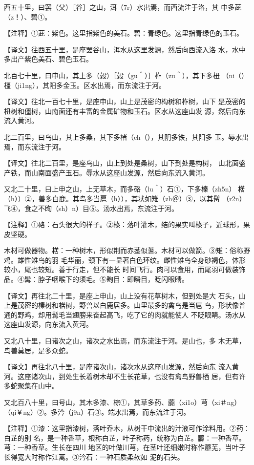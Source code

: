 \documentclass[a4paper,12pt,UTF8,twoside]{ctexbook}
\begin{document}
西五十里，曰罢（父）［谷］之山，洱（7r）水出焉，而西流注于洛，其 中多茈（z！）、碧①。

【注释】①茈：紫色。这里指紫色的美石。碧：青绿色。这里指青绿色的玉石。

【译文】往西五十里，是座罢谷山，洱水从这里发源，然后向西流入洛 水，水中多出产紫色美石、碧色玉石。

北百七十里，曰申山，其上多（穀）［榖（gu＾）］柞（zu＾），其下多杻 （ni（）橿（ji1ng），其阳多金玉。区水出焉，而东流注于河。

【译文】往北一百七十里，是座申山，山上是茂密的构树和柞树，山下 是茂密的杻树和僵树，山南面还有丰富的金属矿物和玉石。区水从这座山发 源，然后向东流入黄河。

北二百里，曰鸟山，其上多桑，其下多楮（ch（），其阴多铁，其阳多 玉。辱水出焉，而东流注于河。

【译文】往北二百里，是座鸟山，山上到处是桑树，山下到处是构树， 山北面盛产铁，而山南面盛产玉石。辱水从这座山发源，然后向东流入黄河。

又北二十里，曰上申之山，上无草木，而多硌（lu＾）石①，下多榛（zh5n） 楛（h））②，兽多白鹿。其鸟多当扈（h）），其状如雉（zh＠）③，以其髯 （r2n）飞④，食之不眴（sh）n）目⑤。汤水出焉，东流注于河。

【注释】①硌：石头很大的样子。②榛：落叶灌木，结的果实叫榛子，近球形，果皮坚硬。

木材可做器物。楛：一种树木，形似荆而赤茎似蓍。木材可以做箭。③雉：俗称野鸡。雄性雉鸟的羽 毛华丽，颈下有一显著白色环纹。雌性雉鸟全身砂褐色，体形较小，尾也较短。善于行走，但不能长 时间飞行。肉可以食用，而尾羽可做装饰品。④髯：脖子咽喉下的须毛。⑤眴目：即瞬目，眨闪眼睛。

【译文】再往北二十里，是座上申山，山上没有花草树木，但到处是大 石头，山上是茂密的榛树和楛树，野兽以白鹿居多。山里最多的禽鸟是当扈 鸟，形状像普通的野鸡，却用髯毛当翅膀来奋起高飞，吃了它的肉就能使人 不眨眼睛。汤水从这座山发源，向东流入黄河。

又北八十里，曰诸次之山，诸次之水出焉，而东流注于河。是山也，多 木无草，鸟兽莫居，是多众蛇。

【译文】再往北八十里，是座诸次山，诸次水从这座山发源，然后向东 流入黄河。这座诸次山，到处生长着树木却不生长花草，也没有禽鸟野兽栖 居，但有许多蛇聚集在山中。

又北百八十里，曰号山，其木多漆、棕①，其草多药、虈（xi1o）芎（xi＃ng） （qi￥ng）②。多汵（j9n）石③。端水出焉，而东流注于河。

【注释】①漆：这里指漆树，落叶乔木，从树干中流出的汁液可作涂料用。②药：白芷的别 名，是一种香草，根称白芷，叶子称药，统称为白芷。虈：一种香草。芎：一种香草。生长在四川 地区的叶做川芎，在茎叶还细嫩时称作蘼芜，当叶子长得宽大时称作江蓠。③汵石：一种石质柔软如 泥的石头。
\end{document}

